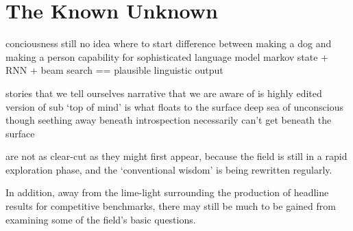 \documentclass[citeauthoryear]{llncs}
\begin{document}
\section{The Known Unknown}

conciousness 
  still no idea where to start
  difference between making a dog and making a person
    capability for sophisticated language model
      markov state + RNN + beam search == plausible linguistic output
  
  stories that we tell ourselves
    narrative that we are aware of is highly edited version of sub
      `top of mind' is what floats to the surface
      deep sea of unconscious though seething away beneath
  introspection necessarily can't get beneath the surface

 are not as clear-cut as they might first appear,
because the field is still in a rapid exploration phase, and the `conventional wisdom' is
being rewritten regularly.  

In addition, away from the lime-light surrounding 
the production of headline results for competitive benchmarks, 
there may still be much to be gained from examining some of 
the field's basic questions.
\end{document}
